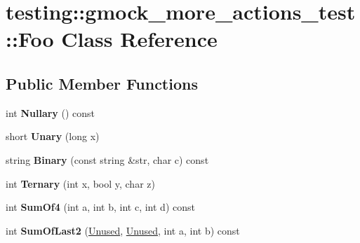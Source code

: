 \hypertarget{classtesting_1_1gmock__more__actions__test_1_1_foo}{}\section{testing\+:\+:gmock\+\_\+more\+\_\+actions\+\_\+test\+:\+:Foo Class Reference}
\label{classtesting_1_1gmock__more__actions__test_1_1_foo}
\subsection*{Public Member Functions}
\begin{DoxyCompactItemize}
\item 
\mbox{\label{classtesting_1_1gmock__more__actions__test_1_1_foo_ad6ba38dbb9b1594ac178630f07c4baa5}} 
int {\bfseries Nullary} () const
\item 
\mbox{\label{classtesting_1_1gmock__more__actions__test_1_1_foo_a68d2b46d6cc7d51979b0254940af6090}} 
short {\bfseries Unary} (long x)
\item 
\mbox{\label{classtesting_1_1gmock__more__actions__test_1_1_foo_a15d8082ba501899c8ac1d93543ed9ad3}} 
string {\bfseries Binary} (const string \&str, char c) const
\item 
\mbox{\label{classtesting_1_1gmock__more__actions__test_1_1_foo_afc5b86988210ad598fa3a2a9822297e4}} 
int {\bfseries Ternary} (int x, bool y, char z)
\item 
\mbox{\label{classtesting_1_1gmock__more__actions__test_1_1_foo_a69ca68e84528904032bad9533a23fb0a}} 
int {\bfseries Sum\+Of4} (int a, int b, int c, int d) const
\item 
\mbox{\label{classtesting_1_1gmock__more__actions__test_1_1_foo_abc041eb7a8e8211656495f2540f315ec}} 
int {\bfseries Sum\+Of\+Last2} (\mbox{\hyperlink{classtesting_1_1internal_1_1_ignored_value}{Unused}}, \mbox{\hyperlink{classtesting_1_1internal_1_1_ignored_value}{Unused}}, int a, int b) const

\end{DoxyCompactItemize}
